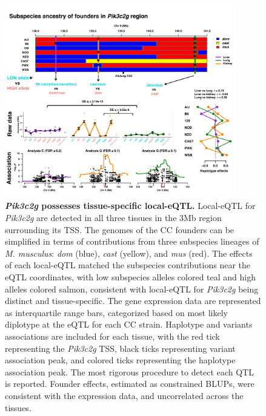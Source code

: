 \documentclass[9pt,twocolumn,twoside]{gsajnl}
\begin{document}
\begin{figure}[h!]
\renewcommand{\familydefault}{\sfdefault}\normalfont
\centering
\includegraphics[width=0.9\textwidth, trim={0in 0.5in 0in 0in}, clip]{figs/pik3c2g_example.pdf}
\caption{\textbf{\textit{Pik3c2g} possesses tissue-specific local-eQTL.} Local-eQTL for \textit{Pik3c2g} are detected in all three tissues in the 3Mb region surrounding its TSS. The genomes of the CC founders can be simplified in terms of contributions from three subspecies lineages of \textit{M. musculus}: \textit{dom} (blue), \textit{cast} (yellow), and \textit{mus} (red). The effects of each local-eQTL matched the subspecies contributions near the eQTL coordinates, with low subspecies alleles colored teal and high alleles colored salmon, consistent with local-eQTL for \textit{Pik3c2g} being distinct and tissue-specific. The gene expression data are represented as interquartile range bars, categorized based on most likely diplotype at the eQTL for each CC strain. Haplotype and variants associations are included for each tissue, with the red tick representing the \textit{Pik3c2g} TSS, black ticks representing variant association peak, and colored ticks representing the haplotype association peak. The most rigorous procedure to detect each QTL is reported. Founder effects, estimated as constrained BLUPs, were consistent with the expression data, and uncorrelated across the tissues.\label{fig:pik3c2g}}
\end{figure}
\end{document}
